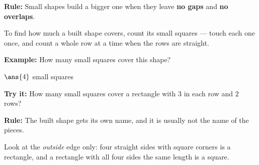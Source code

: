 \documentclass[12pt]{article}
\begin{document}


\begin{formulabox}
\textbf{Rule:} Small shapes build a bigger one when they leave \textbf{no gaps} and \textbf{no overlaps}.\par
To find how much a built shape covers, count its small squares --- touch each one once, and count a whole row at a time when the rows are straight.
\end{formulabox}

\begin{examplebox}
\textbf{Example:} \quad How many small squares cover this shape?
\begin{center}
\end{center}

$\ans{4}$ small squares
\end{examplebox}

\begin{tryitbox}
\textbf{Try it:} \quad How many small squares cover a rectangle with $3$ in each row and $2$ rows?\\[2pt]
\end{tryitbox}


\begin{formulabox}
\textbf{Rule:} The built shape gets its own name, and it is usually not the name of the pieces.\par
Look at the \emph{outside} edge only: four straight sides with square corners is a rectangle, and a rectangle with all four sides the same length is a square.
\end{formulabox}
\end{document}
